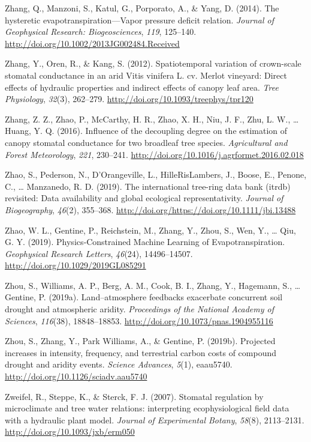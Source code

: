 \documentclass[11pt,twoside]{reedthesis}
\begin{document}
\hypertarget{ref-Zhang2014}{}
Zhang, Q., Manzoni, S., Katul, G., Porporato, A., \& Yang, D. (2014).
The hysteretic evapotranspiration---Vapor pressure deficit relation.
\emph{Journal of Geophysical Research: Biogeosciences}, \emph{119},
125--140. \url{http://doi.org/10.1002/2013JG002484.Received}

\hypertarget{ref-zhang_spatiotemporal_2012}{}
Zhang, Y., Oren, R., \& Kang, S. (2012). Spatiotemporal variation of
crown-scale stomatal conductance in an arid Vitis vinifera L. cv. Merlot
vineyard: Direct effects of hydraulic properties and indirect effects of
canopy leaf area. \emph{Tree Physiology}, \emph{32}(3), 262--279.
\url{http://doi.org/10.1093/treephys/tpr120}

\hypertarget{ref-zhang_influence_2016}{}
Zhang, Z. Z., Zhao, P., McCarthy, H. R., Zhao, X. H., Niu, J. F., Zhu,
L. W., \ldots{} Huang, Y. Q. (2016). Influence of the decoupling degree
on the estimation of canopy stomatal conductance for two broadleaf tree
species. \emph{Agricultural and Forest Meteorology}, \emph{221},
230--241. \url{http://doi.org/10.1016/j.agrformet.2016.02.018}

\hypertarget{ref-Zhao2019}{}
Zhao, S., Pederson, N., D'Orangeville, L., HilleRisLambers, J., Boose,
E., Penone, C., \ldots{} Manzanedo, R. D. (2019). The international
tree-ring data bank (itrdb) revisited: Data availability and global
ecological representativity. \emph{Journal of Biogeography},
\emph{46}(2), 355--368.
\url{http://doi.org/https://doi.org/10.1111/jbi.13488}

\hypertarget{ref-zhao_physicsconstrained_2019}{}
Zhao, W. L., Gentine, P., Reichstein, M., Zhang, Y., Zhou, S., Wen, Y.,
\ldots{} Qiu, G. Y. (2019). Physics‐Constrained Machine Learning of
Evapotranspiration. \emph{Geophysical Research Letters}, \emph{46}(24),
14496--14507. \url{http://doi.org/10.1029/2019GL085291}

\hypertarget{ref-zhou_landatmosphere_2019}{}
Zhou, S., Williams, A. P., Berg, A. M., Cook, B. I., Zhang, Y.,
Hagemann, S., \ldots{} Gentine, P. (2019a). Land--atmosphere feedbacks
exacerbate concurrent soil drought and atmospheric aridity.
\emph{Proceedings of the National Academy of Sciences}, \emph{116}(38),
18848--18853. \url{http://doi.org/10.1073/pnas.1904955116}

\hypertarget{ref-zhou_projected_2019}{}
Zhou, S., Zhang, Y., Park Williams, A., \& Gentine, P. (2019b).
Projected increases in intensity, frequency, and terrestrial carbon
costs of compound drought and aridity events. \emph{Science Advances},
\emph{5}(1), eaau5740. \url{http://doi.org/10.1126/sciadv.aau5740}

\hypertarget{ref-Zweifel2007}{}
Zweifel, R., Steppe, K., \& Sterck, F. J. (2007). Stomatal regulation by
microclimate and tree water relations: interpreting ecophysiological
field data with a hydraulic plant model. \emph{Journal of Experimental
Botany}, \emph{58}(8), 2113--2131.
\url{http://doi.org/10.1093/jxb/erm050}


\end{document}
